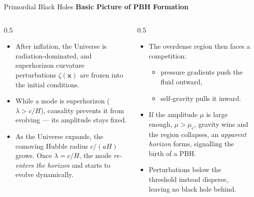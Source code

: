 \documentclass[aspectratio=169, 12pt]{beamer}
\begin{document}
\begin{frame}{Primordial Black Holes}
	{\large\bfseries Basic Picture of PBH Formation}
	\begin{columns}[T]
		\begin{column}{0.5\textwidth}
			{
				\small
			\begin{itemize}
				\item After inflation, the Universe is radiation-dominated, and
					  superhorizon curvature perturbations $\zeta(\mathbf{x})$
					  are frozen into the initial conditions.
				\item While a mode is superhorizon ($\lambda > c/H$), causality
					  prevents it from evolving — its amplitude stays fixed.
				\item As the Universe expands, the comoving Hubble radius
					  $c/(aH)$ grows. Once $\lambda = c/H$, the mode
					  \emph{re-enters the horizon} and starts to evolve
					  dynamically.
			\end{itemize}
			}
		\end{column}
		\pause
		\begin{column}{0.5\textwidth}
			\begin{itemize}
				\item The overdense region then faces a competition:
					  \begin{itemize}
						  \item pressure gradients push the fluid outward,
						  \item self-gravity pulls it inward.
					  \end{itemize}
				\item If the amplitude $\mu$ is large enough, $\mu > \mu_c$, gravity wins and the
					  region collapses, an \emph{apparent horizon} forms,
					  signalling the birth of a PBH.
				\item Perturbations below the threshold instead disperse, leaving
					  no black hole behind.
			\end{itemize}
		\end{column}
	\end{columns}
\end{frame}
	
\end{document}
